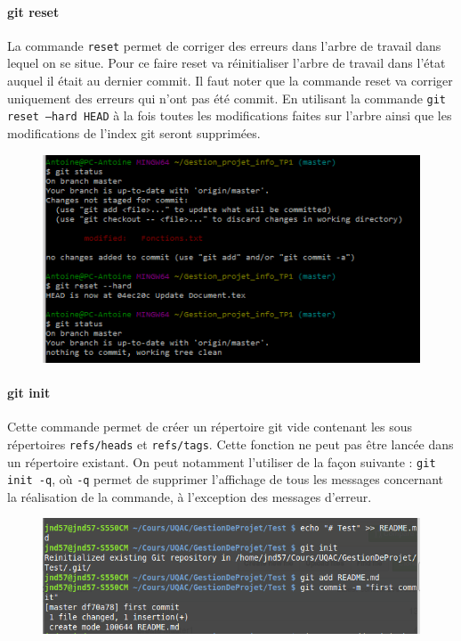 \documentclass[11pt,canadien]{article}
\begin{document}
\paragraph{git reset}La commande \texttt{reset} permet de corriger des erreurs dans l'arbre de travail dans lequel on se situe. Pour ce faire reset va réinitialiser l'arbre de travail dans l'état auquel il était au dernier commit. Il faut noter que la commande reset va corriger uniquement des erreurs qui n'ont pas été commit. En utilisant la commande \texttt{git reset --hard HEAD} à la fois toutes les modifications faites sur l'arbre ainsi que les modifications de l'index git seront supprimées.
\begin{figure}[H]
	\centering
	\includegraphics{images/git_reset.png}
\end{figure}

\paragraph{git init}Cette commande permet de créer un répertoire git vide contenant les sous répertoires \texttt{refs/heads} et \texttt{refs/tags}. Cette fonction ne peut pas être lancée dans un répertoire existant. On peut notamment l’utiliser de la façon suivante : \texttt{git init -q}, où \texttt{-q} permet de supprimer l’affichage de tous les messages concernant la réalisation de la commande, à l’exception des messages d’erreur.
\begin{figure}[H]
	\centering
	\includegraphics[width=\textwidth]{images/git-init.png}
\end{figure}
\end{document}
